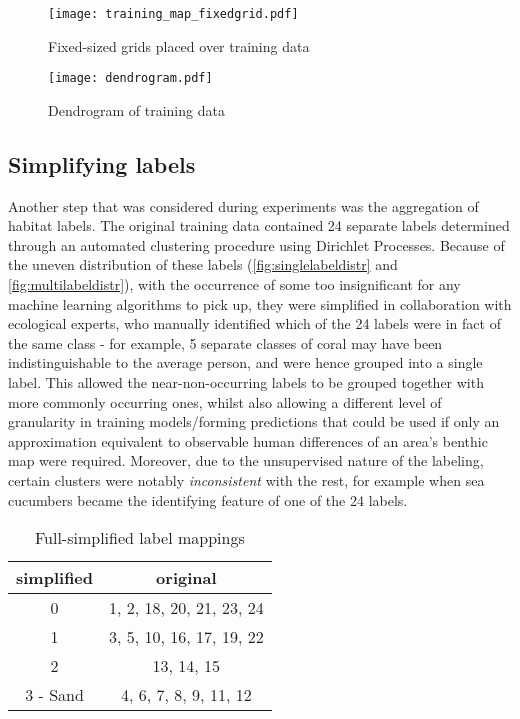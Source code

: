 \begin{figure}[H]
    \texttt{[image: training\_map\_fixedgrid.pdf]}
    \caption{Fixed-sized grids placed over training data}
    \label{fig:gridsplit}
\end{figure} 
\begin{figure}[H]
    \centering
    \texttt{[image: dendrogram.pdf]}
    \caption{Dendrogram of training data}
    \label{fig:dendrogram}
\end{figure}

\subsection{Simplifying labels}
Another step that was considered during experiments was the aggregation of habitat labels. The original training data contained 24 separate labels determined through an automated clustering procedure using Dirichlet Processes. Because of the uneven distribution of these labels (\autoref{fig:singlelabeldistr} and \autoref{fig:multilabeldistr}), with the occurrence of some too insignificant for any machine learning algorithms to pick up, they were simplified in collaboration with ecological experts, who manually identified which of the 24 labels were in fact of the same class - for example, 5 separate classes of coral may have been indistinguishable to the average person, and were hence grouped into a single label. This allowed the near-non-occurring labels to be grouped together with more commonly occurring ones, whilst also allowing a different level of granularity in training models/forming predictions that could be used if only an approximation equivalent to observable human differences of an area's benthic map were required. Moreover, due to the unsupervised nature of the labeling, certain clusters were notably \textit{inconsistent} with the rest, for example when sea cucumbers became the identifying feature of one of the 24 labels.

\begin{table}[H]
    \centering
    \begin{tabular}{|c| c|}
        \hline
        simplified & original \\\hline
        0 & 1, 2, 18, 20, 21, 23, 24 \\
        1 & 3, 5, 10, 16, 17, 19, 22\\
        2 & 13, 14, 15 \\
        3 - Sand & 4, 6, 7, 8, 9, 11, 12 \\
        \hline
    \end{tabular}
    \caption{Full-simplified label mappings \tiny{}}
    \label{table:labelmappings}
\end{table}

